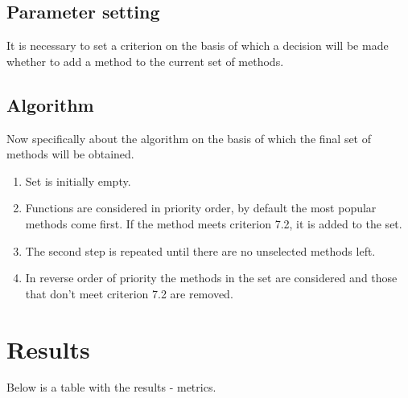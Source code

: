 \documentclass[anonymous,sigplan,review,11pt,nonacm,natbib=false]{acmart}
\begin{document}
    \subsection{Parameter setting}

    It is necessary to set a criterion on the basis of which a decision will be made whether to add a method to the current set of methods.

    \subsection{Algorithm}

    Now specifically about the algorithm on the basis of which the final set of methods will be obtained.

    \begin{enumerate}
        \item Set is initially empty.
        \item Functions are considered in priority order, by default the most popular methods come first. If the method meets criterion 7.2, it is added to the set.
        \item The second step is repeated until there are no unselected methods left.
        \item In reverse order of priority the methods in the set are considered and those that don't meet criterion 7.2 are removed.
    \end{enumerate}

    \section{Results}

    Below is a table with the results - metrics.
\end{document}
